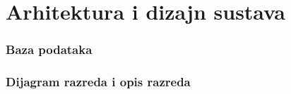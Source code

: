 \chapter{Arhitektura i dizajn sustava}

\subsection{Baza podataka}

\subsection{Dijagram razreda i opis razreda}


\eject